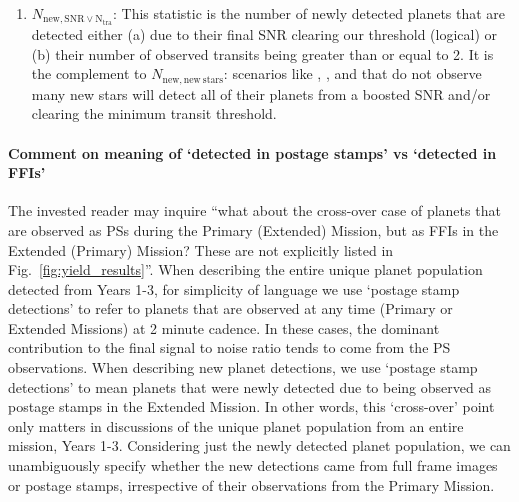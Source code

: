 \begin{enumerate}
	\item $N_\mathrm{new,SNR\lor N_{tra}}$:
	This statistic is the number of newly detected planets that are detected either (a) due to their final SNR clearing our threshold (logical) or (b) their number of observed transits being greater than or equal to 2.
	It is the complement to $N_\mathrm{new,new\ stars}$: scenarios like \nhemi, \npole, and \hemis\:that do not observe many new stars will detect all of their planets from a boosted SNR and/or clearing the minimum transit threshold.
	
\end{enumerate}

\paragraph{Comment on meaning of `detected in postage stamps' vs `detected in FFIs'}
The invested reader may inquire ``what about the cross-over case of planets that are observed as PSs during the Primary (Extended) Mission, but as FFIs in the Extended (Primary) Mission? These are not explicitly listed in Fig.~\ref{fig:yield_results}''.
When describing the entire unique planet population detected from Years 1-3, for simplicity of language we use `postage stamp detections' to refer to planets that are observed at any time (Primary or Extended Missions) at 2 minute cadence.
In these cases, the dominant contribution to the final signal to noise ratio tends to come from the PS observations.
When describing new planet detections, we use `postage stamp detections' to mean planets that were newly detected due to being observed as postage stamps in the Extended Mission.
In other words, this `cross-over' point only matters in discussions of the unique planet population from an entire mission, Years 1-3.
Considering just the newly detected planet population, we can unambiguously specify whether the new detections came from full frame images or postage stamps, irrespective of their observations from the Primary Mission.
